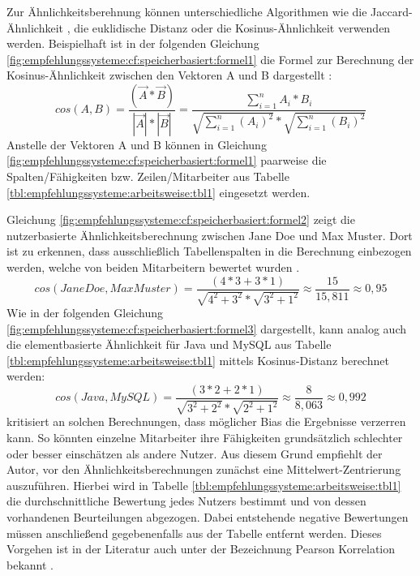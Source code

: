 Zur Ähnlichkeitsberehnung können unterschiedliche Algorithmen wie die Jaccard-Ähnlichkeit \cite[S. 2]{bharti:2019}, die euklidische Distanz \cite[S. 3]{cheng:2013} oder die Kosinus-Ähnlichkeit \cite[S. 2]{duong:2018} verwenden werden. Beispielhaft ist in der folgenden Gleichung \ref{fig:empfehlungssysteme:cf:speicherbasiert:formel1} die Formel zur Berechnung der Kosinus-Ähnlichkeit zwischen den Vektoren A und B dargestellt \cite[S. 111]{bharti:2019}:
\begin{equation}
cos(A,B) = \frac{(\vec{A} * \vec{B})}{|\vec{A}| * |\vec{B}|} = \frac{\sum_{i=1}^n A_i * B_i}{\sqrt{\sum_{i=1}^n (A_i)^2} * \sqrt{\sum_{i=1}^n (B_i)^2}}
\label{fig:empfehlungssysteme:cf:speicherbasiert:formel1}
\end{equation}
Anstelle der Vektoren A und B können in Gleichung \ref{fig:empfehlungssysteme:cf:speicherbasiert:formel1} paarweise die Spalten/Fähigkeiten bzw. Zeilen/Mitarbeiter aus Tabelle \ref{tbl:empfehlungssysteme:arbeitsweise:tbl1} eingesetzt werden.

Gleichung \ref{fig:empfehlungssysteme:cf:speicherbasiert:formel2} zeigt die nutzerbasierte Ähnlichkeitsberechnung zwischen Jane Doe und Max Muster. Dort ist zu erkennen, dass ausschließlich Tabellenspalten in die Berechnung einbezogen werden, welche von beiden Mitarbeitern bewertet wurden \cite[S. 2f.]{hao:2013}.
\begin{equation}
	cos(Jane Doe,Max Muster) = \frac{(4*3 + 3*1)}{\sqrt{4^2 + 3^2} * \sqrt{3^2 + 1^2}} \approx \frac{15}{15,811} \approx 0,95
	\label{fig:empfehlungssysteme:cf:speicherbasiert:formel2}
\end{equation}
Wie in der folgenden Gleichung \ref{fig:empfehlungssysteme:cf:speicherbasiert:formel3} dargestellt, kann analog auch die elementbasierte Ähnlichkeit für Java und MySQL aus Tabelle \ref{tbl:empfehlungssysteme:arbeitsweise:tbl1} mittels Kosinus-Distanz berechnet werden:
\begin{equation}
	cos(Java, MySQL) = \frac{(3*2 + 2*1)}{\sqrt{3^2 + 2^2} * \sqrt{2^2 + 1^2}} \approx \frac{8}{8,063} \approx 0,992
	\label{fig:empfehlungssysteme:cf:speicherbasiert:formel3}
\end{equation}
\textcite[S. 35ff.]{recommenderSystems:2016} kritisiert an solchen Berechnungen, dass möglicher Bias die Ergebnisse verzerren kann. So könnten einzelne Mitarbeiter ihre Fähigkeiten grundsätzlich schlechter oder besser einschätzen als andere Nutzer. Aus diesem Grund empfiehlt der Autor, vor den Ähnlichkeitsberechnungen zunächst eine Mittelwert-Zentrierung auszuführen. Hierbei wird in Tabelle \ref{tbl:empfehlungssysteme:arbeitsweise:tbl1} die durchschnittliche Bewertung jedes Nutzers bestimmt und von dessen vorhandenen Beurteilungen abgezogen. Dabei entstehende negative Bewertungen müssen anschließend gegebenenfalls aus der Tabelle entfernt werden. Dieses Vorgehen ist in der Literatur auch unter der Bezeichnung Pearson Korrelation bekannt \cite[S. 3]{bharti:2019}.

